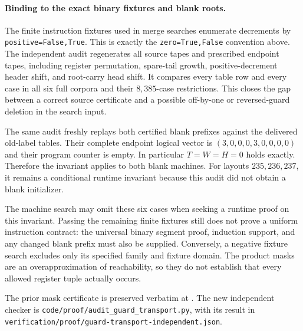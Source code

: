 \paragraph{Binding to the exact binary fixtures and blank roots.}
The finite instruction fixtures used in merge searches enumerate
decrements by \texttt{positive=False,True}.  This is exactly the
\texttt{zero=True,False} convention above.  The independent audit
regenerates all source tapes and prescribed endpoint tapes, including
register permutation, spare-tail growth, positive-decrement header
shift, and root-carry head shift.  It compares every table row and
every case in all six full corpora and their $8,385$-case restrictions.
This closes the gap between a correct source certificate and a possible
off-by-one or reversed-guard deletion in the search input.

The same audit freshly replays both certified blank prefixes against
the delivered old-label tables.  Their complete endpoint logical vector
is $(3,0,0,0,3,0,0,0,0)$ and their program counter is empty.  In
particular $T=W=H=0$ holds exactly.  Therefore the invariant applies to
both blank machines.  For layouts $235,236,237$, it remains a conditional
runtime invariant because this audit did not obtain a blank initializer.

The machine search may omit these six cases when seeking a runtime
proof on this invariant.  Passing the remaining finite fixtures still
does not prove a uniform instruction contract: the universal binary
segment proof, induction support, and any changed blank prefix must
also be supplied.  Conversely, a negative fixture search excludes only
its specified family and fixture domain.  The product masks are an
overapproximation of reachability, so they do not establish that every
allowed register tuple actually occurs.

The prior mask certificate is preserved verbatim at
.
The new independent checker is
\texttt{code/proof/audit\_guard\_transport.py}, with its result in
\texttt{verification/proof/guard-transport-independent.json}.
